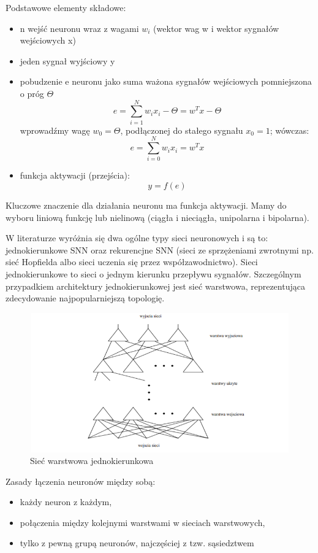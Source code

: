 Podstawowe elementy składowe: 
\begin{itemize}
    \item n wejść neuronu wraz z wagami $w_{i}$ (wektor wag w i wektor sygnałów wejściowych x)
    \item jeden sygnał wyjściowy y
    \item pobudzenie e neuronu jako suma ważona sygnałów wejściowych
pomniejszona o próg $\Theta$
\[
e = \sum_{i=1}^{N} w_{i} x_{i} - \Theta = w^{T} x - \Theta
\]
wprowadźmy wagę $w_{0}= \Theta$, podłączonej do stałego sygnału $x_{0} = 1$;
wówczas: 
\[
e = \sum_{i=0}^{N} w_{i} x_{i}  = w^{T} x
\]
\item funkcja aktywacji (przejścia):
\[
y = f(e)
\]
\end{itemize}
Kluczowe znaczenie dla działania neuronu ma funkcja aktywacji. Mamy do wyboru liniową funkcję lub nielinową (ciągła i nieciągła, unipolarna i bipolarna).

W literaturze wyróżnia się dwa ogólne typy sieci neuronowych i są to: jednokierunkowe SNN oraz rekurencjne SNN (sieci ze sprzężeniami zwrotnymi np. sieć Hopfielda albo sieci uczenia się przez współzawodnictwo).
Sieci jednokierunkowe to sieci o jednym kierunku przepływu sygnałów. Szczególnym przypadkiem architektury jednokierunkowej jest sieć warstwowa, reprezentująca zdecydowanie najpopularniejszą topologię.
\begin{figure}[H] 
        \centering\includegraphics[width=12cm,height=6cm]{figures/ArchitekturaSNN.png}
        \caption{Sieć warstwowa jednokierunkowa}\label{SVM-neuron}
\end{figure}

Zasady łączenia neuronów między sobą:
\begin{itemize}
    \item każdy neuron z każdym,
    \item połączenia między kolejnymi warstwami w sieciach warstwowych,
    \item tylko z pewną grupą neuronów, najczęściej z tzw. sąsiedztwem
\end{itemize}

